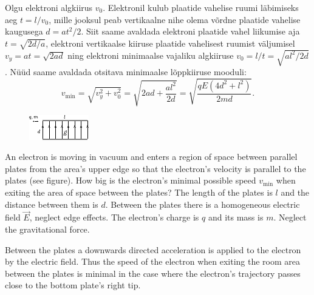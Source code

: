 Olgu elektroni algkiirus $v_0$. Elektronil kulub plaatide vahelise ruumi läbimiseks aeg $t=l/v_0$, mille jooksul peab vertikaalne nihe olema võrdne plaatide vahelise kaugusega $d=at^2/2$. Siit saame avaldada elektroni plaatide vahel liikumise aja $t=\sqrt{2d/a}$, elektroni vertikaalse kiiruse plaatide vahelisest ruumist väljumisel $v_y=at=\sqrt{2ad}$ ning elektroni minimaalse vajaliku algkiiruse $v_0=l/t=\sqrt{al^2/2d}$. Nüüd saame avaldada otsitava minimaalse lõppkiiruse mooduli:
\[
v_\mathrm{min}=\sqrt{v_y^2+v_0^2}=\sqrt{2ad+\frac{al^2}{2d}}=\sqrt{\frac{qE\left(4d^2+l^2\right)}{2md}}.
\]

\begin{figure}
	\vspace{-10pt}
	\hspace{-10pt}
	\includegraphics[width=\linewidth]{2017-lahg-03-elJoonisMK}
\end{figure}
An electron is moving in vacuum and enters a region of space between parallel plates from the area’s upper edge so that the electron’s velocity is parallel to the plates (see figure). How big is the electron’s minimal possible speed $v_\mathrm{min}$ when exiting the area of space between the plates? The length of the plates is $l$ and the distance between them is $d$. Between the plates there is a homogeneous electric field $\vec{E}$, neglect edge effects. The electron’s charge is $q$ and its mass is $m$. Neglect the gravitational force.

\hinteng
Between the plates a downwards directed acceleration is applied to the electron by the electric field. Thus the speed of the electron when exiting the room area between the plates is minimal in the case where the electron's trajectory passes close to the bottom plate's right tip.

